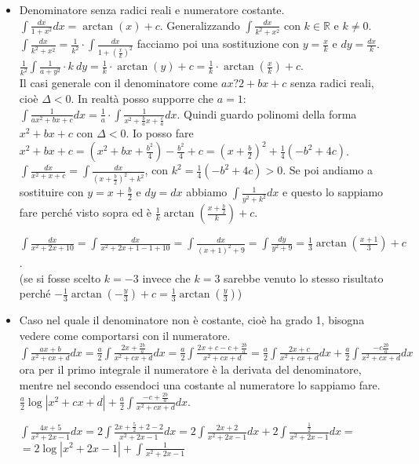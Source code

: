 \begin{itemize}
    \item Denominatore senza radici reali e numeratore costante.\\
    $\int \frac{dx}{1+x^2}dx = \arctan(x) + c$. Generalizzando $\int \frac{dx}{k^2 + x^2}$ con $k \in \mathbb{R}$ e $k\neq 0$.\\
    $\int \frac{dx}{k^2 + x^2} = \frac{1}{k^2}\cdot \int \frac{dx}{1 + (\frac{x}{k})^2}$ facciamo poi una sostituzione con $y= \frac{x}{k}$ e $dy = \frac{dx}{k}$.\\
    $\frac{1}{k^2} \int \frac{1}{a+y^2} \cdot k \: dy = \frac{1}{k} \cdot \arctan(y) + c = \frac{1}{k} \cdot \arctan(\frac{x}{k}) + c$.\\
    Il casi generale con il denominatore come $ax?2 +bx + c$ senza radici reali, cioè $\Delta < 0$. In realtà posso supporre che $a = 1$:
    $\int \frac{1}{ax^2 + bx + c}dx = \frac{1}{a}\cdot \int \frac{1}{x^2 + \frac{b}{a}x + \frac{c}{a}}dx$. Quindi guardo polinomi della forma $x^2 + bx + c$ con $\Delta < 0$. Io posso fare $x^2 + bx + c = (x^2 + bx + \frac{b^2}{4}) - \frac{b^2}{4} + c = (x + \frac{b}{2})^2 + \frac{1}{4}(-b^2 + 4c)$.\\
    $\int \frac{dx}{x^2 + x + c} = \int \frac{dx}{(x + \frac{b}{2})^2 + k^2}$, con $k^2 = \frac{1}{4}(-b^2 + 4c) > 0$. Se poi andiamo a sostituire con $y = x + \frac{b}{2}$ e $dy = dx$ abbiamo $\int \frac{1}{y^2 + k^2}dx$ e questo lo sappiamo fare perché visto sopra ed è $\frac{1}{k}\arctan(\frac{x + \frac{b}{2}}{k})+c$.
    
    \begin{example}
    $\int \frac{dx}{x^2 + 2x + 10} = \int \frac{dx}{x^2 + 2x + 1 - 1 + 10} = \int \frac{dx}{(x+1)^2 + 9} = \int \frac{dy}{y^2 + 9} = \frac{1}{3}\arctan(\frac{x+1}{3})+c$.\\
    (se si fosse scelto $k=-3$ invece che $k=3$ sarebbe venuto lo stesso risultato perché $-\frac{1}{3}\arctan(-\frac{y}{3}) + c = \frac{1}{3}\arctan(\frac{y}{3})$)
    \end{example}
    
    \item Caso nel quale il denominatore non è costante, cioè ha grado 1, bisogna vedere come comportarsi con il numeratore.\\
    $\int \frac{ax + b}{x^2 + cx + d}dx = \frac{a}{2} \int \frac{2x + \frac{2b}{a}}{x^2 + cx + d}dx = \frac{a}{2}\int \frac{2x + c - c + \frac{2b}{a}}{x^2 + cx + d} = \frac{a}{2}\int \frac{2x + c}{x^2 + cx + d}dx + \frac{a}{2}\int \frac{-c \frac{2b}{a}}{x^2 + cx + d}dx$ ora per il primo integrale il numeratore è la derivata del denominatore, mentre nel secondo essendoci una costante al numeratore lo sappiamo fare.\\
    $\frac{a}{2}\log|x^2 + cx + d| + \frac{a}{2}\int \frac{-c + \frac{2b}{a}}{x^2 + cx + d}dx$.
    \begin{example}
    $\int \frac{4x + 5}{x^2 + 2x - 1}dx = 2\int \frac{2x + \frac{5}{2} + 2 - 2}{x^2 + 2x - 1}dx = 2 \int \frac{2x + 2}{x^2 + 2x - 1}dx + 2 \int \frac{\frac{1}{2}}{x^2 + 2x - 1}dx =$\\ $=2\log|x^2 + 2x - 1| + \int \frac{1}{x^2 + 2x - 1}$
    \end{example}
\end{itemize}

